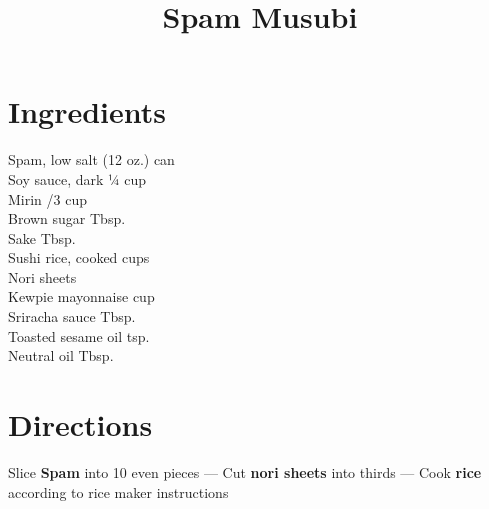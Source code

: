 \documentclass[11pt,letterpaper]{article}
\title{Spam Musubi}
\author{}
\date{}
\begin{document}
\maketitle
\thispagestyle{empty}

\section*{Ingredients}
\setlength{\columnsep}{20pt}
\begin{multicols}{2}
\noindent
    Spam, low salt  (12 oz.) can \\
    Soy sauce, dark \dotfill ¼ cup \\
    Mirin /3 cup \\
    Brown sugar  Tbsp. \\
    Sake  Tbsp. \\
    Sushi rice, cooked  cups \\
    Nori sheets  \\
    Kewpie mayonnaise  cup \\
    Sriracha sauce  Tbsp. \\
    Toasted sesame oil  tsp. \\
    Neutral oil  Tbsp.
\end{multicols}

\section*{Directions}

\noindent
Slice \textbf{Spam} into 10 even pieces ---
Cut \textbf{nori sheets} into thirds ---
Cook \textbf{rice} according to rice maker instructions
\end{document}
